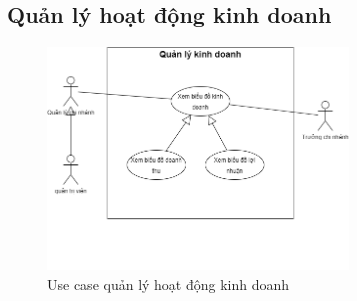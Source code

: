 \subsection{Quản lý hoạt động kinh doanh}
\begin{figure}[!htp]
    \centering
    \includegraphics[width=8cm]{img/UseCase/UseCase-Quản lý hoạt động kinh doanh.drawio.png}
    \newline
    \caption{Use case quản lý hoạt động kinh doanh}
\end{figure}
